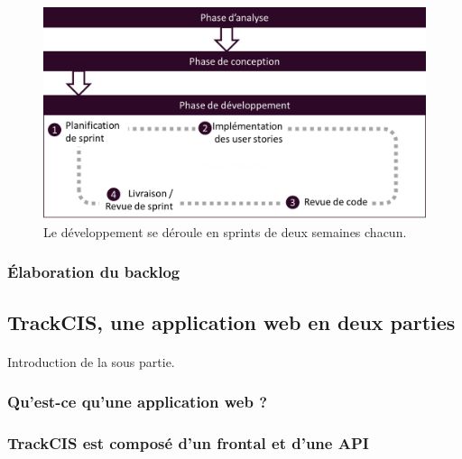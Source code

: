 			\begin{figure}[h]%
				\centering
				\includegraphics[width=15cm]{../img/part3/methodo_dev.png}
				\caption{\label{methodo_dev} Le développement se déroule en sprints de
				deux semaines chacun.}
			\end{figure}
		
		\subsubsection{Élaboration du backlog}
	
	\subsection{TrackCIS, une application web en deux parties}
		\paragraph{}
		Introduction de la sous partie.
		
		\subsubsection{Qu'est-ce qu'une application web ?}
			\paragraph{}%
			
			\paragraph{}%
			
		\subsubsection{TrackCIS est composé d'un frontal et d'une API}
